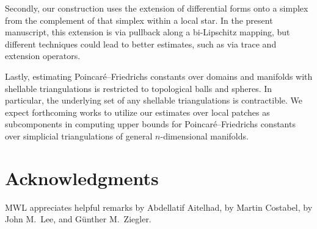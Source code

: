 \documentclass[10pt,a4paper]{article}
\begin{document}
Secondly, our construction uses the extension of differential forms onto a simplex from the complement of that simplex within a local star. 
In the present manuscript, this extension is via pullback along a bi-Lipschitz mapping, but different techniques could lead to better estimates,
such as via trace and extension operators.

Lastly, estimating Poincar\'e--Friedrichs constants over domains and manifolds with shellable triangulations is restricted to topological balls and spheres. 
In particular, the underlying set of any shellable triangulations is contractible. 
We expect forthcoming works to utilize our estimates over local patches as subcomponents in computing upper bounds for Poincar\'e--Friedrichs constants over simplicial triangulations of general $n$-dimensional manifolds. 




\section*{Acknowledgments}
MWL appreciates helpful remarks by Abdellatif Aitelhad, by Martin Costabel, by John M.\ Lee, and G\"unther M.\ Ziegler.



\end{document}
